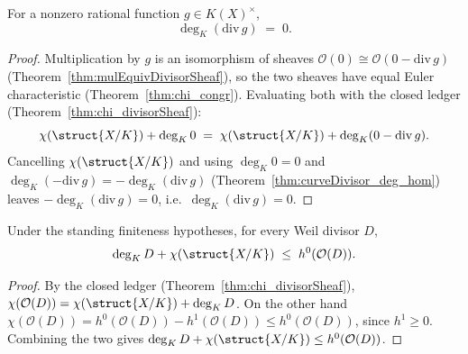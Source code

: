 \begin{theorem}
  \label{thm:deg_divOf}
  \leanok
  For a nonzero rational function \(g \in K(X)^\times\),
  \[
    \deg_K(\mathrm{div}\, g) \;=\; 0 .
  \]
\end{theorem}
\begin{proof}
  \leanok
  Multiplication by \(g\) is an isomorphism of sheaves
  \(\mathcal O(0) \cong \mathcal O(0 - \mathrm{div}\, g)\)
  (Theorem~\ref{thm:mulEquivDivisorSheaf}), so the two sheaves have equal Euler characteristic
  (Theorem~\ref{thm:chi_congr}). Evaluating both with the closed ledger
  (Theorem~\ref{thm:chi_divisorSheaf}):
  \[
    \chi(\struct{X/K}) + \deg_K 0 \;=\; \chi(\struct{X/K}) + \deg_K(0 - \mathrm{div}\, g).
  \]
  Cancelling \(\chi(\struct{X/K})\) and using \(\deg_K 0 = 0\) and
  \(\deg_K(-\mathrm{div}\, g) = -\deg_K(\mathrm{div}\, g)\)
  (Theorem~\ref{thm:curveDivisor_deg_hom}) leaves \(-\deg_K(\mathrm{div}\, g) = 0\), i.e.\
  \(\deg_K(\mathrm{div}\, g) = 0\).
\end{proof}

\begin{theorem}
  \label{thm:riemann_inequality}
  \leanok
  Under the standing finiteness hypotheses, for every Weil divisor \(D\),
  \[
    \deg_K D + \chi(\struct{X/K}) \;\le\; h^0(\mathcal O(D)).
  \]
\end{theorem}
\begin{proof}
  \leanok
  By the closed ledger (Theorem~\ref{thm:chi_divisorSheaf}),
  \(\chi(\mathcal O(D)) = \chi(\struct{X/K}) + \deg_K D\). On the other hand
  \(\chi(\mathcal O(D)) = h^0(\mathcal O(D)) - h^1(\mathcal O(D)) \le h^0(\mathcal O(D))\), since
  \(h^1 \ge 0\). Combining the two gives \(\deg_K D + \chi(\struct{X/K}) \le h^0(\mathcal O(D))\).
\end{proof}

